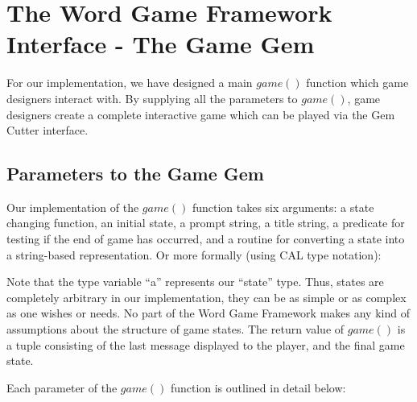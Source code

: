 \section{The Word Game Framework Interface - The Game Gem}
\label{gameImplement}

For our implementation, we have designed a main \(game()\) function which game designers interact with.  By supplying all the parameters to \(game()\), game designers create a complete interactive game which can be played via the Gem Cutter interface.  

\subsection{Parameters to the Game Gem}

Our implementation of the \(game()\) function takes six arguments: a state changing function, an initial state, a prompt string, a title string, a predicate for testing if the end of game has occurred, and a routine for converting a state into a string-based representation.  Or more formally (using CAL type notation):


Note that the type variable ``a'' represents our ``state'' type.  Thus, states are completely arbitrary in our implementation, they can be as simple or as complex as one wishes or needs.  No part of the Word Game Framework makes any kind of assumptions about the structure of game states.  The return value of \(game()\) is a tuple consisting of the last message displayed to the player, and the final game state.

Each parameter of the \(game()\) function is outlined in detail below:

